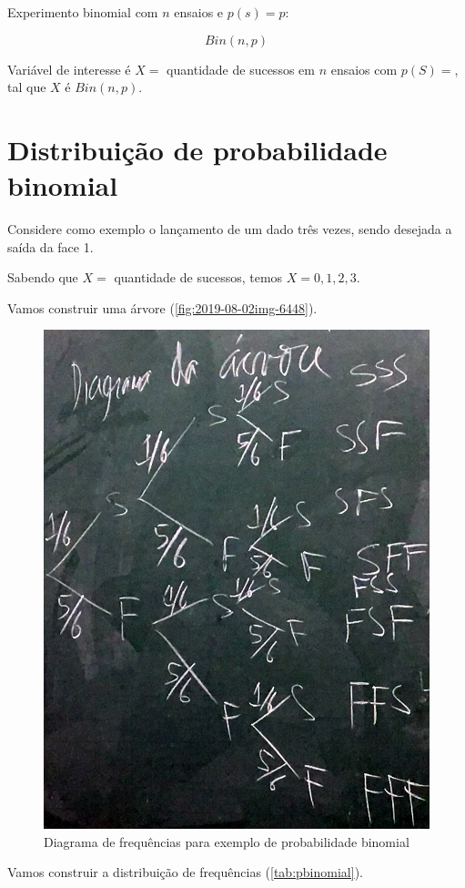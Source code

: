 \documentclass[a4paper]{article}
\begin{document}
	Experimento binomial com $n$ ensaios e $p(s)=p$:
	
	\begin{equation*}
		Bin(n,p)
	\end{equation*}
	
	Variável de interesse é $X =$ quantidade de sucessos em $n$ ensaios com $p(S)=$, tal que $X$ é $Bin(n,p)$.
	
	\section{Distribuição de probabilidade binomial}
	
	Considere como exemplo o lançamento de um dado três vezes, sendo desejada a saída da face 1.
	
	Sabendo que $X =$ quantidade de sucessos, temos $X = 0, 1, 2, 3$.
	
	Vamos construir uma árvore (\autoref{fig:2019-08-02img-6448}).
	
	\begin{figure}[h]
		\centering
		\caption{Diagrama de frequências para exemplo de probabilidade binomial}
		\label{fig:2019-08-02img-6448}
		\includegraphics[width=0.7\linewidth]{img/2019-08-02_IMG-6448}
	\end{figure}	
	
	Vamos construir a distribuição de frequências (\autoref{tab:pbinomial}).
	
\end{document}
